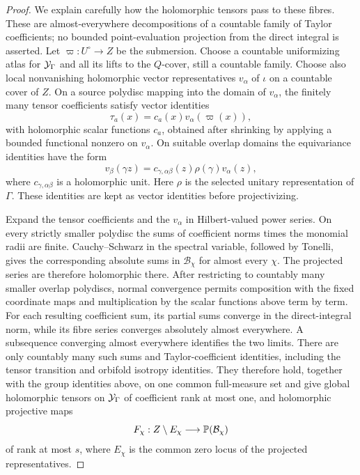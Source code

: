\begin{proof}
We explain carefully how the holomorphic tensors pass to these
fibres. These are almost-everywhere decompositions of a countable
family of Taylor coefficients; no bounded point-evaluation projection
from the direct integral is asserted. Let
\(\varpi:U^\circ\to Z\) be the submersion. Choose a countable
uniformizing atlas for \(\mathcal Y_\Gamma\) and all its lifts to the
\(Q\)-cover, still a countable family. Choose also local nonvanishing
holomorphic vector representatives \(v_\alpha\) of \(\iota\) on a
countable cover of \(Z\). On a source polydisc mapping
into the domain of \(v_\alpha\), the finitely many tensor coefficients
satisfy vector identities
\[
 \tau_a(x)=c_a(x)v_\alpha(\varpi(x)),
\]
with holomorphic scalar functions \(c_a\), obtained after shrinking
by applying a bounded functional nonzero on \(v_\alpha\).
On suitable overlap
domains the equivariance identities have the form
\[
 v_\beta(\gamma z)
 =c_{\gamma,\alpha\beta}(z)\rho(\gamma)v_\alpha(z),
\]
where \(c_{\gamma,\alpha\beta}\) is a holomorphic unit.
Here \(\rho\) is the selected unitary representation of \(\Gamma\).
These identities are kept as vector identities before projectivizing.

Expand the tensor coefficients and the \(v_\alpha\) in
Hilbert-valued power series. On every strictly smaller polydisc the
sums of coefficient norms times the monomial radii are finite.
Cauchy--Schwarz in the spectral variable, followed by Tonelli,
gives the corresponding absolute sums in
\(\mathcal B_\chi\) for almost every \(\chi\). The projected series
are therefore holomorphic there. After restricting to countably
many smaller overlap polydiscs, normal convergence permits
composition with the fixed coordinate maps and multiplication by
the scalar functions above term by term. For each resulting coefficient
sum, its partial sums converge in the direct-integral norm, while
its fibre series converges absolutely almost everywhere. A subsequence
converging almost everywhere identifies the two limits. There are
only countably many such sums and Taylor-coefficient identities,
including the tensor transition and orbifold isotropy identities.
They therefore hold, together with the group identities above,
on one common full-measure set and give global
holomorphic tensors on
\(\mathcal Y_\Gamma\) of coefficient rank at most one, and holomorphic
projective maps
\[
 F_\chi:Z\setminus E_\chi\longrightarrow\mathbb P(\mathcal B_\chi)
\]
of rank at most \(s\), where \(E_\chi\) is the common zero locus of
the projected representatives.


\end{proof}
